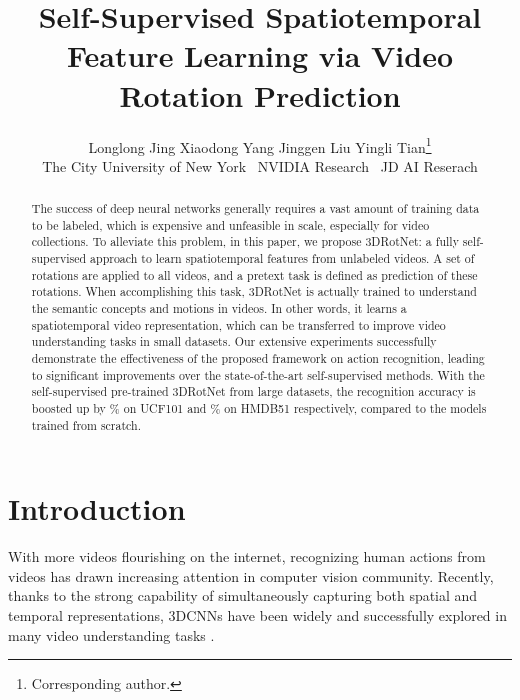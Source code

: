 \documentclass[10pt,twocolumn,letterpaper]{article}
\begin{document}
\title{Self-Supervised Spatiotemporal Feature Learning via Video Rotation Prediction
}

\author{
  Longlong Jing \quad Xiaodong Yang \quad Jinggen Liu \quad Yingli Tian\thanks{Corresponding author.}\\ 
  The City University of New York ~NVIDIA Research ~JD AI Reserach\\
}





\maketitle


\begin{abstract}
The success of deep neural networks generally requires a vast amount of training data to be labeled, which is expensive and unfeasible in scale, especially for video collections. To alleviate this problem, in this paper, we propose 3DRotNet: a fully self-supervised approach to learn spatiotemporal features from unlabeled videos. A set of rotations are applied to all videos, and a pretext task is defined as prediction of these rotations. When accomplishing this task, 3DRotNet is actually trained to understand the semantic concepts and motions in videos. In other words, it learns a spatiotemporal video representation, which can be transferred to improve video understanding tasks in small datasets. Our extensive experiments successfully demonstrate the effectiveness of the proposed framework on action recognition, leading to significant improvements over the state-of-the-art self-supervised methods. With the self-supervised pre-trained 3DRotNet from large datasets, the recognition accuracy is boosted up by \% on UCF101 and \% on HMDB51 respectively, compared to the models trained from scratch. 
\end{abstract}



\section{Introduction}

With more videos flourishing on the internet, recognizing human actions from videos \cite{P3D, RC3D, videocapsulenet, UnsupervisedMeta, Sultani_2018_CVPR, multilayer, prernn} has drawn increasing attention in computer vision community. Recently, thanks to the strong capability of simultaneously capturing both spatial and temporal representations, 3DCNNs have been widely and successfully explored in many video understanding tasks \cite{I3D, T3D, 3DResNet,C3D}.
\end{document}
